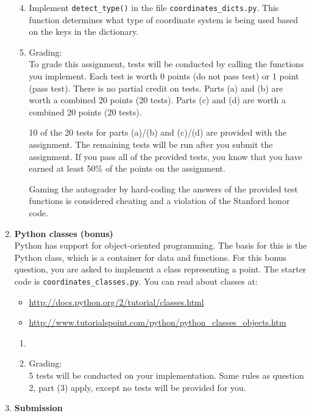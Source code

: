 \documentclass{article}
\newcounter{points}
\newcommand\printpoints{Total number of points: \thepoints}
\begin{document}
\begin{enumerate}
\begin{enumerate}
\setcounter{enumii}{3}
\item Implement \texttt{detect\_type()} in the file \texttt{coordinates\_dicts.py}.  This function determines what type of coordinate system is being used based on the keys in the dictionary.
\end{enumerate}

\begin{enumerate}
\setcounter{enumii}{4}
\item Grading: \\

To grade this assignment, tests will be conducted by calling the functions you implement.  Each test is worth 0 points (do not pass test) or 1 point (pass test).  There is no partial credit on tests.  Parts (a) and (b) are worth a combined 20 points (20 tests).  Parts (c) and (d) are worth a combined 20 points (20 tests).

10 of the 20 tests for parts (a)/(b) and (c)/(d) are provided with the assignment.  The remaining tests will be run after you submit the assignment.  If you pass all of the provided tests, you know that you have earned at least 50\% of the points on the assignment.

Gaming the autograder by hard-coding the answers of the provided test functions is considered cheating and a violation of the Stanford honor code.
\end{enumerate}


\item \textbf{Python classes (bonus)} \\
Python has support for object-oriented programming.  The basis for this is the Python class, which is a container for data and functions.  For this bonus question, you are asked to implement a class representing a point.  The starter code is \texttt{coordinates\_classes.py}.  You can read about classes at:

\begin{itemize}
\item \url{http://docs.python.org/2/tutorial/classes.html}
\item \url{http://www.tutorialspoint.com/python/python_classes_objects.htm}
\end{itemize}

\begin{enumerate}
\item 
\end{enumerate}

\begin{enumerate}
\setcounter{enumii}{1}
\item Grading: \\

5 tests will be conducted on your implementation.  Same rules as question 2, part (3) apply, except no tests will be provided for you.
\end{enumerate}

\item \textbf{Submission} \\



\end{enumerate}
\end{document}
